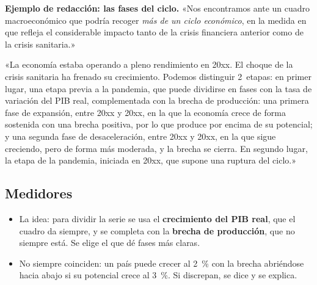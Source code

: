 \documentclass[11pt]{article}
\begin{document}
\begin{anotaciones}
\textbf{Ejemplo de redacción: las fases del ciclo.}
«Nos encontramos ante un cuadro macroeconómico que podría recoger \emph{más de un ciclo económico}, en la medida en que refleja el considerable impacto tanto de la crisis financiera anterior como de la crisis sanitaria.»

«La economía estaba operando a pleno rendimiento en 20xx. El choque de la crisis sanitaria ha frenado su crecimiento. Podemos distinguir 2~etapas: en primer lugar, una etapa previa a la pandemia, que puede dividirse en fases con la tasa de variación del PIB real, complementada con la brecha de producción: una primera fase de expansión, entre 20xx y 20xx, en la que la economía crece de forma sostenida con una brecha positiva, por lo que produce por encima de su potencial; y una segunda fase de desaceleración, entre 20xx y 20xx, en la que sigue creciendo, pero de forma más moderada, y la brecha se cierra. En segundo lugar, la etapa de la pandemia, iniciada en 20xx, que supone una ruptura del ciclo.»
\end{anotaciones}

\subsection{Medidores}\label{sec:medidores}

\begin{itemize}
\item La idea: para dividir la serie se usa el \textbf{crecimiento del PIB real}, que el cuadro da siempre, y se completa con la \textbf{brecha de producción}, que no siempre está. Se elige el que dé fases más claras.
\item No siempre coinciden: un país puede crecer al 2~\% con la brecha abriéndose hacia abajo si su potencial crece al 3~\%. Si discrepan, se dice y se explica.
\end{itemize}
\end{document}
